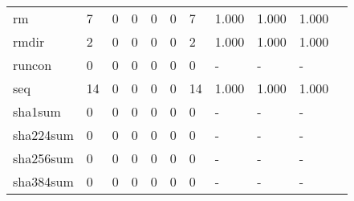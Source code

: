\begin{longtable}{lp{1.10cm}p{1.10cm}p{1.10cm}p{1.10cm}p{1.10cm}p{1.10cm}p{1.10cm}p{1.10cm}p{1.10cm}p{1.10cm}}
rm        &                      7 &                                  0 &                                 0 &                                0 &                                 0 &                               7 &                          1.000 &                                 1.000 &                               1.000 \\
rmdir     &                      2 &                                  0 &                                 0 &                                0 &                                 0 &                               2 &                          1.000 &                                 1.000 &                               1.000 \\
runcon    &                      0 &                                  0 &                                 0 &                                0 &                                 0 &                               0 &                              - &                                     - &                                   - \\
seq       &                     14 &                                  0 &                                 0 &                                0 &                                 0 &                              14 &                          1.000 &                                 1.000 &                               1.000 \\
sha1sum   &                      0 &                                  0 &                                 0 &                                0 &                                 0 &                               0 &                              - &                                     - &                                   - \\
sha224sum &                      0 &                                  0 &                                 0 &                                0 &                                 0 &                               0 &                              - &                                     - &                                   - \\
sha256sum &                      0 &                                  0 &                                 0 &                                0 &                                 0 &                               0 &                              - &                                     - &                                   - \\
sha384sum &                      0 &                                  0 &                                 0 &                                0 &                                 0 &                               0 &                              - &                                     - &                                   - \\

\end{longtable}
